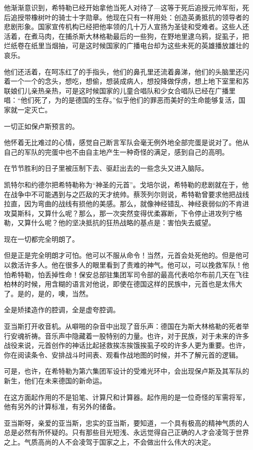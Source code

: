 他渐渐意识到，希特勒已经开始拿他当死人对待了—这等于死后追授元帅军衔，死后追授带橡树叶的骑士十字勋章。他现在只有一样用处：创造英勇抵抗的领导者的悲剧形象。国家宣传机构已经把他率领的几十万人宣扬为圣徒和受难者。这些人还活着，在煮马肉，在捕杀斯大林格勒最后的一些狗，在野地里逮乌鸦，捉虱子，把烂纸卷在纸里当烟抽，可是这时候国家的广播电台却为这些未死的英雄播放雄壮的哀乐。

他们还活着，在呵冻红了的手指头，他们的鼻孔里还流着鼻涕，他们的头脑里还闪着一个一个的念头，想吃，想偷，想装成病人，想投降做俘虏，想上地下室里和苏联娘们儿亲热亲热，可是这时候国家的儿童合唱队和少女合唱队已经在广播里唱：“他们死了，为的是德国的生存。”似乎他们的罪恶而美好的生命能够复活，国家就一定灭亡。

一切正如保卢斯预言的。

他怀着无比难过的心情，感觉自己断言军队会毫无例外地全部完蛋是说对了。他从自己的军队的完蛋中也不由自主地产生一种奇怪的满足，感到自己的高明。

在节节胜利的日子里被压制下去、驱赶出去的一些念头又进入脑际。

凯特尔和约德尔把希特勒称为“神圣的元首”。戈培尔说，希特勒的悲剧就在于，他在战争中不可能遇到与之匹敌的天才统帅。蔡茨列尔则说，希特勒曾要求他把战线拉直，因为弯曲的战线有损他的美感。那么，就像神经错乱、神经衰弱似的不肯进攻莫斯科，又算什么呢？那么，那一次突然变得优柔寡断，下令停止进攻列宁格勒，又算什么呢？他的坚决抵抗的狂热战略的基点是：害怕失去威望。

现在一切都完全明朗了。

但是正是完全明朗才可怕。他可以不服从命令！当然，元首会处死他的。但是他可以救活许多人。他在很多人的眼里看到了责难的神气。他可以，可以挽救军队！他怕希特勒，怕丢掉性命！保安总部驻集团军司令部的最高代表哈尔布前几天在飞往柏林的时候，用含糊的语言对他说，即使在德国这样的民族中，元首也是太伟大了。是的，是的，噢，当然。

全是矫揉造作的腔调，全是虚夸腔调。

亚当斯打开收音机。从噼啪的杂音中出现了音乐声：德国在为斯大林格勒的死者举行安魂祈祷。音乐声中隐藏着一股特别的力量。也许，对于民族，对于未来的许多战役来说，元首创作的神话比起拯救挨冻挨饿挨虱子咬的许多人更为重要。也许，你在阅读条令、安排战斗时间表、观看作战地图的时候，并不了解元首的逻辑。

可是，也许，在希特勒为第六集团军设计的受难光环中，会出现保卢斯及其军队的新生，他们在未来德国的新命运。

在这方面起作用的不是铅笔、计算尺和计算器。起作用的是一位奇怪的军需将军，他有另外的计算标准，有另外的储备。

亚当斯呀，亲爱的亚当斯，忠实的亚当斯，要知道，一个具有极高的精神气质的人总是必然有所怀疑的。只有那些目光短浅、永远觉得自己正确的人才会凌驾于世界之上。气质高尚的人不会凌驾于国家之上，不会做出什么伟大的决定。

